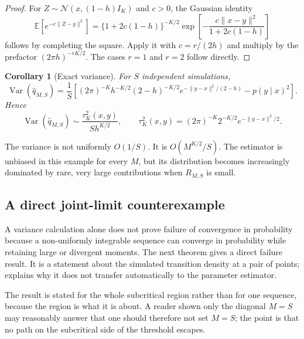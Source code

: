 \documentclass[11pt]{article}
\newtheorem{corollary}[corollary]{Corollary}
\theoremstyle{definition}
\newcommand{\E}{\mathbb{E}}
\newcommand{\Var}{\operatorname{Var}}
\newcommand{\Normal}{\mathcal{N}}
\begin{document}
\begin{proof}
For $Z\sim\Normal(x,(1-h)I_K)$ and $c>0$, the Gaussian identity
\[
\E\!\left[e^{-c\|Z-y\|^2}\right]
=\{1+2c(1-h)\}^{-K/2}
\exp\!\left[-\frac{c\|x-y\|^2}{1+2c(1-h)}\right]
\]
follows by completing the square. Apply it with $c=r/(2h)$ and multiply by the prefactor $(2\pi h)^{-rK/2}$. The cases $r=1$ and $r=2$ follow directly.
\end{proof}

\begin{corollary}[Exact variance]\label{cor:brownian_variance}
For $S$ independent simulations,
\begin{equation}\label{eq:brownian_estimator_variance}
\Var(\widehat q_{M,S})
=
\frac{1}{S}\left[
(2\pi)^{-K}h^{-K/2}(2-h)^{-K/2}
 e^{-\|y-x\|^2/(2-h)}
-p(y\mid x)^2
\right].
\end{equation}
Hence
\begin{equation}\label{eq:brownian_variance_asymptotic}
\Var(\widehat q_{M,S})
\sim
\frac{\tau_K^2(x,y)}{S h^{K/2}},
\qquad
\tau_K^2(x,y)
=(2\pi)^{-K}2^{-K/2}e^{-\|y-x\|^2/2}.
\end{equation}
\end{corollary}

The variance is not uniformly $O(1/S)$. It is $O(M^{K/2}/S)$. The estimator is unbiased in this example for every $M$, but its distribution becomes increasingly dominated by rare, very large contributions when $R_{M,S}$ is small.

\subsection{A direct joint-limit counterexample}

A variance calculation alone does not prove failure of convergence in probability because a non-uniformly integrable sequence can converge in probability while retaining large or divergent moments. The next theorem gives a direct failure result. It is a statement about the simulated transition density at a pair of points;  explains why it does not transfer automatically to the parameter estimator.

The result is stated for the whole subcritical region rather than for one sequence, because the region is what it is about. A reader shown only the diagonal $M=S$ may reasonably answer that one should therefore not set $M=S$; the point is that no path on the subcritical side of the threshold escapes.
\end{document}
